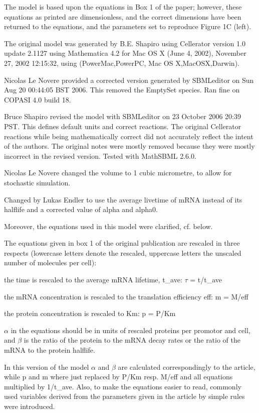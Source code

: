 \documentclass{article}
\begin{document}
The model is based upon the equations in Box 1 of the paper; however, these equations as printed are dimensionless, and the correct dimensions have been returned to the equations, and the parameters set to reproduce Figure 1C (left).

The original model was generated by B.E. Shapiro using Cellerator version 1.0 update 2.1127 using Mathematica 4.2 for Mac OS X (June 4, 2002), November 27, 2002 12:15:32, using (PowerMac,PowerPC, Mac OS X,MacOSX,Darwin).

Nicolas Le Novere provided a corrected version generated by SBMLeditor on Sun Aug 20 00:44:05 BST 2006. This removed the EmptySet species. Ran fine on COPASI 4.0 build 18.

Bruce Shapiro revised the model with SBMLeditor on 23 October 2006 20:39 PST. This defines default units and correct reactions. The original Cellerator reactions while being mathematically correct did not accurately reflect the intent of the authors. The original notes were mostly removed because they were mostly incorrect in the revised version. Tested with MathSBML 2.6.0.

Nicolas Le Novere changed the volume to 1 cubic micrometre, to allow for stochastic simulation.

Changed by Lukas Endler to use the average livetime of mRNA instead of its halflife and a corrected value of alpha and alpha0.

Moreover, the equations used in this model were clarified, cf. below.

The equations given in box 1 of the original publication are rescaled in three respects (lowercase letters denote the rescaled, uppercase letters the unscaled number of molecules per cell):

the time is rescaled to the average mRNA lifetime, t\_ave: \ensuremath{\tau} = t/t\_ave

the mRNA concentration is rescaled to the translation efficiency eff: m = M/eff

the protein concentration is rescaled to Km: p = P/Km

\ensuremath{\alpha} in the equations should be in units of rescaled proteins per promotor and cell, and \ensuremath{\beta} is the ratio of the protein to the mRNA decay rates or the ratio of the mRNA to the protein halflife.

In this version of the model \ensuremath{\alpha} and \ensuremath{\beta} are calculated correspondingly to the article, while p and m where just replaced by P/Km resp. M/eff and all equations multiplied by 1/t\_ave. Also, to make the equations easier to read, commonly used variables derived from the parameters given in the article by simple rules were introduced.
\end{document}
